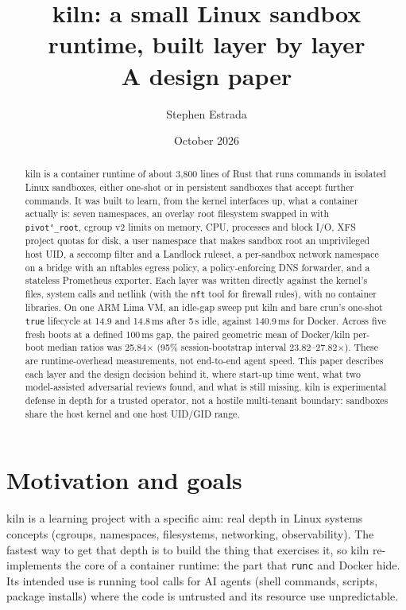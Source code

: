 \documentclass[10pt,letterpaper]{article}
\title{\vspace{-1.6em}\textbf{kiln: a small Linux sandbox runtime, built layer by layer}\\[2pt]
\large A design paper}
\author{Stephen Estrada\\{\small\code{github.com/lambda-nine/kiln}}}
\date{October 2026}
\newcommand{\code}[1]{\texttt{#1}}
\newcommand{\us}{\char`\_}
\begin{document}
\maketitle
\vspace{-1.2em}

\begin{abstract}
\noindent kiln is a container runtime of about 3{,}800 lines of Rust that runs commands
in isolated Linux sandboxes, either one-shot or in persistent sandboxes that
accept further commands. It was built to learn, from the
kernel interfaces up, what a container actually is: seven namespaces, an overlay
root filesystem swapped in with \code{pivot\us{}root}, cgroup v2 limits on memory,
CPU, processes and block I/O, XFS project quotas for disk, a user namespace that
makes sandbox root an unprivileged host UID, a seccomp filter and a Landlock
ruleset, a per-sandbox network namespace on a bridge with an nftables egress
policy, a policy-enforcing DNS forwarder, and a stateless Prometheus exporter.
Each layer was written directly against the kernel's files, system calls and
netlink (with the \code{nft} tool for firewall rules), with no container
libraries. On one ARM Lima VM, an idle-gap sweep put kiln and bare crun's
one-shot \code{true} lifecycle at 14.9 and 14.8\,ms after 5\,s idle, against
140.9\,ms for Docker. Across five fresh boots at a defined 100\,ms gap,
the paired geometric mean of Docker/kiln per-boot median ratios was
25.84$\times$ (95\% session-bootstrap interval 23.82--27.82$\times$). These are runtime-overhead measurements, not
end-to-end agent speed. This paper describes each layer and the
design decision behind it, where start-up time went, what two model-assisted
adversarial reviews found, and what is still missing. kiln is experimental
defense in depth for a trusted operator, not a hostile multi-tenant boundary:
sandboxes share the host kernel and one host UID/GID range.
\end{abstract}

\section{Motivation and goals}

kiln is a learning project with a specific aim: real depth in Linux systems
concepts (cgroups, namespaces, filesystems, networking, observability). The
fastest way to get that depth is to build the thing that exercises it, so kiln
re-implements the core of a container runtime: the part that \code{runc} and
Docker hide. Its intended use is running tool calls for AI agents (shell
commands, scripts, package installs) where the code is untrusted and its
resource use unpredictable.
\end{document}

